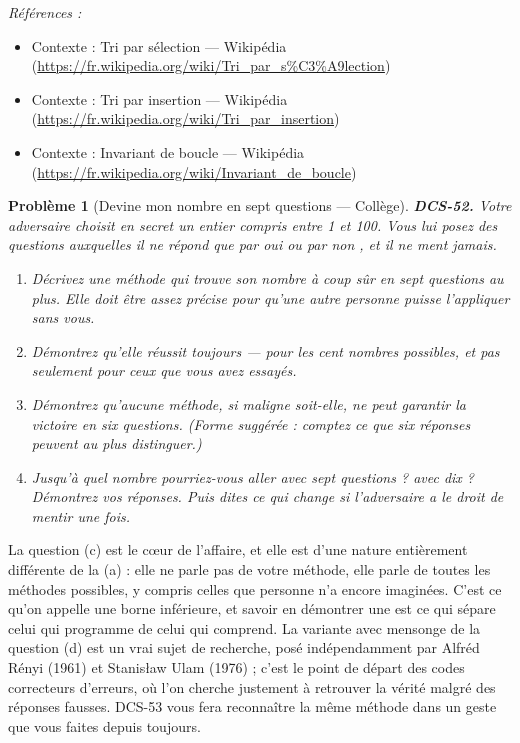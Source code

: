 \documentclass[11pt]{article}
\newtheorem{problem}{Problème}
\newenvironment{refs}{\par\small\noindent\emph{Références :}\begin{itemize}\setlength\itemsep{0pt}}{\end{itemize}\normalsize}
\begin{document}
\begin{refs}
\item Contexte : Tri par sélection --- Wikipédia (\url{https://fr.wikipedia.org/wiki/Tri_par_s%C3%A9lection})
\item Contexte : Tri par insertion --- Wikipédia (\url{https://fr.wikipedia.org/wiki/Tri_par_insertion})
\item Contexte : Invariant de boucle --- Wikipédia (\url{https://fr.wikipedia.org/wiki/Invariant_de_boucle})
\end{refs}

\bigskip

\begin{problem}[{Devine mon nombre en sept questions --- Collège}]
\textbf{DCS-52.} Votre adversaire choisit en secret un entier compris entre 1 et 100. Vous
lui posez des questions auxquelles il ne répond que par \og{} oui \fg{} ou par \og{} non \fg{}, et il ne ment
jamais.
\begin{enumerate}
\item[(a)] Décrivez une méthode qui trouve son nombre à coup sûr en sept questions au plus. Elle
doit être assez précise pour qu'une autre personne puisse l'appliquer sans vous.
\item[(b)] Démontrez qu'elle réussit toujours --- pour les cent nombres possibles, et pas seulement
pour ceux que vous avez essayés.
\item[(c)] Démontrez qu'aucune méthode, si maligne soit-elle, ne peut garantir la victoire en six
questions. (Forme suggérée : comptez ce que six réponses peuvent au plus distinguer.)
\item[(d)] Jusqu'à quel nombre pourriez-vous aller avec sept questions ? avec dix ? Démontrez vos
réponses. Puis dites ce qui change si l'adversaire a le droit de mentir une fois.
\end{enumerate}

\end{problem}

\noindent La question (c) est le c\oe{}ur de l'affaire, et elle est d'une nature
entièrement différente de la (a) : elle ne parle pas de votre méthode, elle parle de toutes
les méthodes possibles, y compris celles que personne n'a encore imaginées. C'est ce qu'on
appelle une borne inférieure, et savoir en démontrer une est ce qui sépare celui qui
programme de celui qui comprend. La variante avec mensonge de la question (d) est un vrai
sujet de recherche, posé indépendamment par Alfréd Rényi (1961) et Stanis\l{}aw Ulam (1976) ;
c'est le point de départ des codes correcteurs d'erreurs, où l'on cherche justement à
retrouver la vérité malgré des réponses fausses. DCS-53 vous fera reconnaître la même
méthode dans un geste que vous faites depuis toujours.
\end{document}
